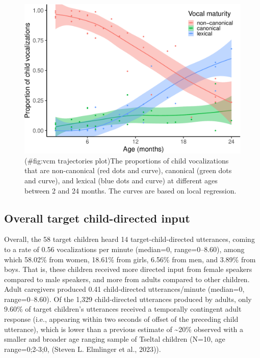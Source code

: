 \documentclass[
  man]{apa6}
\begin{document}
\begin{figure}
\centering
\includegraphics{turntaking_paper_files/figure-latex/vcm trajectories plot-1.pdf}
\caption{(\#fig:vcm trajectories plot)The proportions of child vocalizations that are non-canonical (red dots and curve), canonical (green dots and curve), and lexical (blue dots and curve) at different ages between 2 and 24 months. The curves are based on local regression.}
\end{figure}

\hypertarget{overall-target-child-directed-input}{%
\subsection{Overall target child-directed input}\label{overall-target-child-directed-input}}

Overall, the 58 target children heard 14 target-child-directed utterances, coming to a rate of 0.56 vocalizations per minute (median=0, range=0--8.60), among which 58.02\% from women, 18.61\% from girls, 6.56\% from men, and 3.89\% from boys. That is, these children received more directed input from female speakers compared to male speakers, and more from adults compared to other children. Adult caregivers produced 0.41 child-directed utterances/minute (median=0, range=0--8.60). Of the 1,329 child-directed utterances produced by adults, only 9.60\% of target children's utterances received a temporally contingent adult response (i.e., appearing within two seconds of offset of the preceding child utterance), which is lower than a previous estimate of \textasciitilde20\% observed with a smaller and broader age ranging sample of Tseltal children (N=10, age range=0;2-3;0, (Steven L. Elmlinger et al., 2023)).
\end{document}
